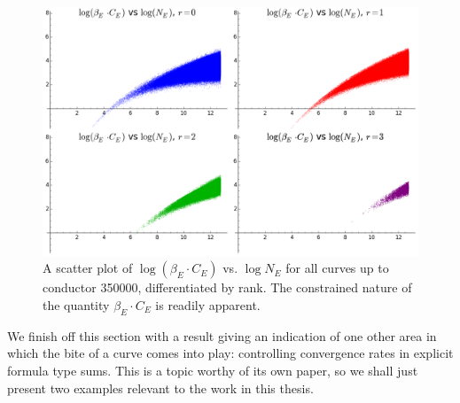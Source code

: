 \begin{figure}[!h]
    \centering
    \includegraphics[width=1.0\textwidth]{graphics/beta_times_C_vs_conductors_array.png}
    \caption{A scatter plot of $\log (\beta_E \cdot C_E) $ vs. $\log N_E$ for all curves up to conductor 350000, differentiated by rank. The constrained nature of the quantity $\beta_E \cdot C_E$ is readily apparent. }
    \label{fig:bites_vs_conductors_array}
\end{figure}

We finish off this section with a result giving an indication of one other area in which the bite of a curve comes into play: controlling convergence rates in explicit formula type sums. This is a topic worthy of its own paper, so we shall just present two examples relevant to the work in this thesis.

